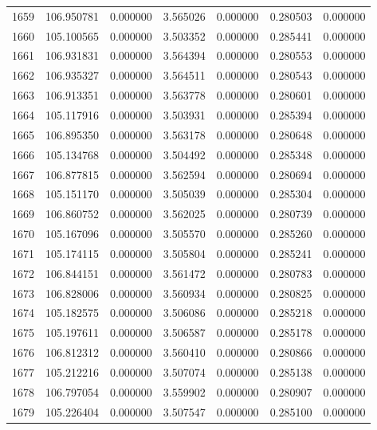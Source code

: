 \begin{tabular}{rrrrrrr}
1659 & 106.950781 &    0.000000 &  3.565026 &   0.000000 &   0.280503 &  0.000000 \\
1660 & 105.100565 &    0.000000 &  3.503352 &   0.000000 &   0.285441 &  0.000000 \\
1661 & 106.931831 &    0.000000 &  3.564394 &   0.000000 &   0.280553 &  0.000000 \\
1662 & 106.935327 &    0.000000 &  3.564511 &   0.000000 &   0.280543 &  0.000000 \\
1663 & 106.913351 &    0.000000 &  3.563778 &   0.000000 &   0.280601 &  0.000000 \\
1664 & 105.117916 &    0.000000 &  3.503931 &   0.000000 &   0.285394 &  0.000000 \\
1665 & 106.895350 &    0.000000 &  3.563178 &   0.000000 &   0.280648 &  0.000000 \\
1666 & 105.134768 &    0.000000 &  3.504492 &   0.000000 &   0.285348 &  0.000000 \\
1667 & 106.877815 &    0.000000 &  3.562594 &   0.000000 &   0.280694 &  0.000000 \\
1668 & 105.151170 &    0.000000 &  3.505039 &   0.000000 &   0.285304 &  0.000000 \\
1669 & 106.860752 &    0.000000 &  3.562025 &   0.000000 &   0.280739 &  0.000000 \\
1670 & 105.167096 &    0.000000 &  3.505570 &   0.000000 &   0.285260 &  0.000000 \\
1671 & 105.174115 &    0.000000 &  3.505804 &   0.000000 &   0.285241 &  0.000000 \\
1672 & 106.844151 &    0.000000 &  3.561472 &   0.000000 &   0.280783 &  0.000000 \\
1673 & 106.828006 &    0.000000 &  3.560934 &   0.000000 &   0.280825 &  0.000000 \\
1674 & 105.182575 &    0.000000 &  3.506086 &   0.000000 &   0.285218 &  0.000000 \\
1675 & 105.197611 &    0.000000 &  3.506587 &   0.000000 &   0.285178 &  0.000000 \\
1676 & 106.812312 &    0.000000 &  3.560410 &   0.000000 &   0.280866 &  0.000000 \\
1677 & 105.212216 &    0.000000 &  3.507074 &   0.000000 &   0.285138 &  0.000000 \\
1678 & 106.797054 &    0.000000 &  3.559902 &   0.000000 &   0.280907 &  0.000000 \\
1679 & 105.226404 &    0.000000 &  3.507547 &   0.000000 &   0.285100 &  0.000000 \\

\end{tabular}
